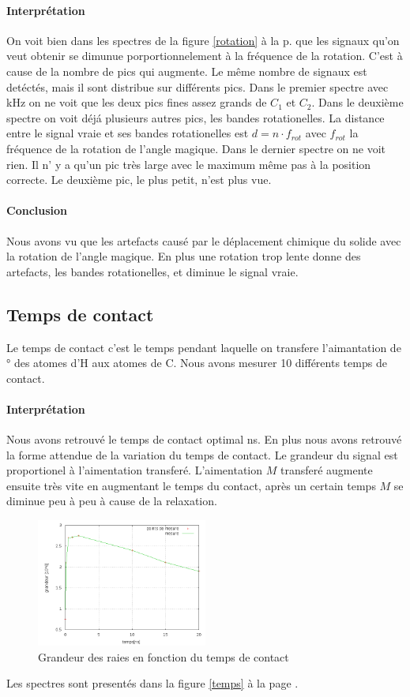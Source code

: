 \documentclass[a4paper,12pt]{scrartcl}
\begin{document}
   \paragraph{Interprétation}
    On voit bien dans les spectres de la figure \ref{rotation} à la p. \pageref{rotation} que les signaux qu'on veut obtenir se dimunue porportionnelement à la fréquence de la rotation. C'est à cause de la nombre de pics qui augmente. Le même nombre de signaux est detéctés, mais il sont distribue sur différents pics. Dans le premier spectre avec \unit[4]{kHz} on ne voit que les deux pics fines assez grands de $C_1$ et $C_2$. Dans le deuxième spectre on voit déjá plusieurs autres pics, les bandes rotationelles. La distance entre le signal vraie et ses bandes rotationelles est $d=n\cdot f_{rot}$ avec $f_{rot}$ la fréquence de la rotation de l'angle magique. Dans le dernier spectre on ne voit rien. Il n' y a qu'un pic très large avec le maximum même pas à la position correcte. Le deuxième pic, le plus petit, n'est plus vue.

   \paragraph{Conclusion}
    Nous avons vu que les artefacts causé par le déplacement chimique du solide avec la rotation de l'angle magique. En plus une rotation trop lente donne des artefacts, les bandes rotationelles, et diminue le signal vraie.
\pagebreak
  \subsection{Temps de contact}
   Le temps de contact c'est le temps pendant laquelle on transfere l'aimantation de \unit[90]{\degree} des atomes d'H aux atomes de C. Nous avons mesurer 10 différents temps de contact.
   \paragraph{Interprétation}
    Nous avons retrouvé le temps de contact optimal \unit[2]{ns}. En plus nous avons retrouvé la forme attendue de la variation du temps de contact. Le grandeur du signal est proportionel à l'aimentation transferé. L'aimentation $M$ transferé augmente ensuite très vite en augmentant le temps du contact, après un certain temps $M$ se diminue peu à peu à cause de la relaxation. 
    \begin{figure}[H]
     \centering
     \includegraphics[width=0.5\textwidth]{plot/temps.png}
     \caption{Grandeur des raies en fonction du temps de contact}
    \end{figure}
    Les spectres sont presentés dans la figure \ref{temps} à la page \pageref{tatmps}.
\end{document}
